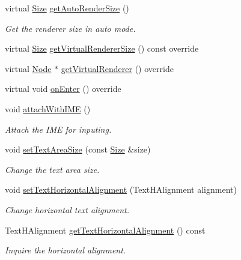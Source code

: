 \begin{DoxyCompactItemize}
\item 
virtual \hyperlink{classSize}{Size} \hyperlink{classui_1_1TextField_a689221888111dc7836a574ffc664dc7c}{get\+Auto\+Render\+Size} ()
\begin{DoxyCompactList}\small\item\em Get the renderer size in auto mode. \end{DoxyCompactList}\item 
virtual \hyperlink{classSize}{Size} \hyperlink{classui_1_1TextField_a1ca24c7493ae07def476b7715f668390}{get\+Virtual\+Renderer\+Size} () const override
\item 
virtual \hyperlink{classNode}{Node} $\ast$ \hyperlink{classui_1_1TextField_a63b989aa3b2a11854b1a7e2bf4659a40}{get\+Virtual\+Renderer} () override
\item 
virtual void \hyperlink{classui_1_1TextField_ad7a8241c7d1a80bc8821e67044ffa20c}{on\+Enter} () override
\item 
\mbox{\label{classui_1_1TextField_a72f0480d878a33b11b355f755fde6d7c}} 
void \hyperlink{classui_1_1TextField_a72f0480d878a33b11b355f755fde6d7c}{attach\+With\+I\+ME} ()
\begin{DoxyCompactList}\small\item\em Attach the I\+ME for inputing. \end{DoxyCompactList}\item 
void \hyperlink{classui_1_1TextField_aef44e7dff3cdd16328b4d2101b9b6dfb}{set\+Text\+Area\+Size} (const \hyperlink{classSize}{Size} \&size)
\begin{DoxyCompactList}\small\item\em Change the text area size. \end{DoxyCompactList}\item 
void \hyperlink{classui_1_1TextField_a5cb293b70c2aa7f8f7c91a9a17376a65}{set\+Text\+Horizontal\+Alignment} (Text\+H\+Alignment alignment)
\begin{DoxyCompactList}\small\item\em Change horizontal text alignment. \end{DoxyCompactList}\item 
Text\+H\+Alignment \hyperlink{classui_1_1TextField_acd343b03227c7cf58a325f34ba3e1d21}{get\+Text\+Horizontal\+Alignment} () const
\begin{DoxyCompactList}\small\item\em Inquire the horizontal alignment. \end{DoxyCompactList}\item 

\end{DoxyCompactItemize}
